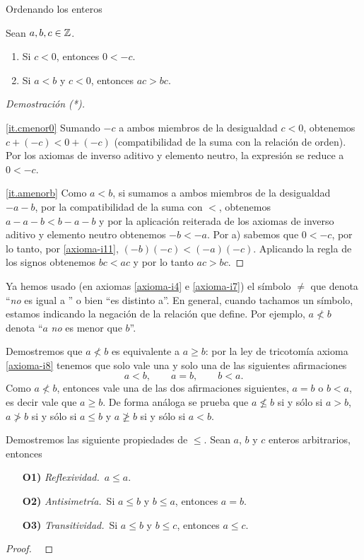 \begin{section}{Ordenando los enteros}
\begin{proposicion}\label{prop-compatibilidad-negativa}
    Sean $a, b, c \in {\mathbb Z}$.  
    \begin{enumerate}[label=\textit{\alph*)}]
        \item\label{it.cmenor0} Si $c < 0$, entonces $0 < -c$.
        \item\label{it.amenorb} Si $a< b$ y $c< 0$, entonces $ac > bc$. 
    \end{enumerate}
\end{proposicion}
\begin{proof}[Demostración (*)] {${}^{}$}
    
    \ref{it.cmenor0} Sumando $-c$ a ambos miembros de la desigualdad $c < 0$, obtenemos $c + (-c) < 0 + (-c)$ (compatibilidad de la suma con la relación de orden). Por los axiomas de inverso aditivo y elemento neutro, la expresión se reduce a $0 < -c$.
    
    \ref{it.amenorb} Como $a < b$, si sumamos a ambos miembros de la desigualdad $-a -b$, por la compatibilidad  de la suma con $<$, obtenemos $a -a -b < b -a -b$ y por la aplicación reiterada de los axiomas de inverso aditivo y elemento neutro  obtenemos $-b < -a$. Por a) sabemos que $0< -c$, por lo tanto, por \ref{axioma-i11}, $(-b)(-c) < (-a)(-c)$. Aplicando la regla de los signos obtenemos $bc < ac$ y por lo tanto $ac > bc$.

\end{proof}

Ya hemos usado (en axiomas \ref{axioma-i4} e \ref{axioma-i7}) el símbolo $\not=$ que denota  ``\textit{no} es igual a '' o bien ``es distinto a''. En  general, cuando tachamos un símbolo, estamos indicando la negación de la relación que define. Por ejemplo, $a\not< b$ denota ``$a$ \textit{no} es menor que $b$''. 

\begin{observacion*} Demostremos que  $a\not< b$ es equivalente a $a\ge b$: por la ley de tricotomía axioma \ref{axioma-i8} tenemos que solo vale una y solo una de las siguientes afirmaciones
$$
a<b, \qquad a = b, \qquad b < a.
$$
Como  $a\not< b$, entonces vale una de las dos afirmaciones siguientes, $a=b$ o $b<a$, es decir  vale que $a \ge b$. De forma análoga se prueba que $a\not\le b$ si  y sólo si $a>b$, $a\not> b$ si  y sólo si $a \le b$ y $a\not\ge b$ si  y sólo si $a<b$.

\end{observacion*}


\begin{ejemplo}\label{relaciondeorden}
Demostremos las siguiente propiedades de $\le$. Sean  $a$, $b$ y $c$  enteros arbitrarios,  entonces
\begin{enumerate}
\item[\textbf{O1)}] \textit{Reflexividad.}\, $a \le a$.
\item[\textbf{O2)}] \textit{Antisimetría.}\, Si $a \le b$ y $b \le a$, entonces $a=b$.
\item[\textbf{O3)}] \textit{Transitividad.}\, Si $a\le b$ y $b\le c$, entonces $a \le c$.
\end{enumerate}
\begin{proof}
\
    

\end{proof}
\end{ejemplo}
\end{section}
